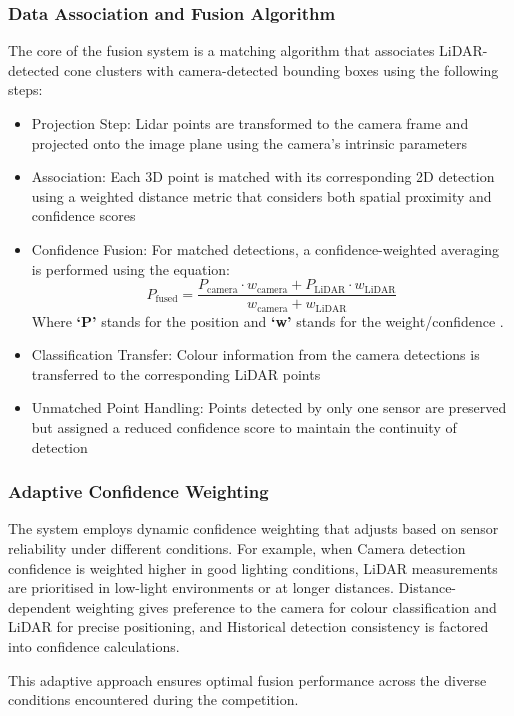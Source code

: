 \documentclass[conference]{IEEEtran}
\begin{document}
\subsubsection{Data Association and Fusion Algorithm}
The core of the fusion system is a matching algorithm that associates LiDAR-detected cone clusters with camera-detected bounding boxes using the following steps:
\begin{itemize}
\item Projection Step: Lidar points are transformed to the camera frame and projected onto the image plane using the camera's intrinsic parameters
\item Association: Each 3D point is matched with its corresponding 2D detection using a weighted distance metric that considers both spatial proximity and confidence scores
\item Confidence Fusion: For matched detections, a confidence-weighted averaging is performed using the equation:
\begin{equation}
P_{\text{fused}} = \frac{P_{\text{camera}} \cdot w_{\text{camera}} + P_{\text{LiDAR}} \cdot w_{\text{LiDAR}}}{w_{\text{camera}} + w_{\text{LiDAR}}}
\end{equation}
Where \textbf{‘P'} stands for the position and \textbf{‘w'} stands for the weight/confidence \cite{b15}.
\item Classification Transfer: Colour information from the camera detections is transferred to the corresponding LiDAR points
\item Unmatched Point Handling: Points detected by only one sensor are preserved but assigned a reduced confidence score to maintain the continuity of detection
\end{itemize}

\subsubsection{Adaptive Confidence Weighting}
The system employs dynamic confidence weighting that adjusts based on sensor reliability under different conditions. For example, when Camera detection confidence is weighted higher in good lighting conditions, LiDAR measurements are prioritised in low-light environments or at longer distances. Distance-dependent weighting gives preference to the camera for colour classification and LiDAR for precise positioning, and Historical detection consistency is factored into confidence calculations.

This adaptive approach ensures optimal fusion performance across the diverse conditions encountered during the competition.
\end{document}
